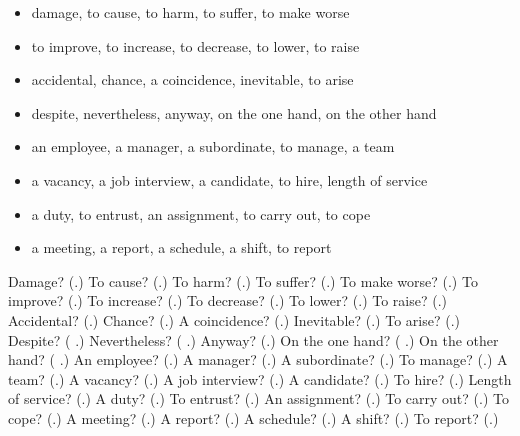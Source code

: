 \begin{itemize}
\raggedright
  \item damage, to cause, to harm, to suffer, to make worse
  \item to improve, to increase, to decrease, to lower, to raise
  \item accidental, chance, a coincidence, inevitable, to arise
  \item despite, nevertheless, anyway, on the one hand, on the other hand
  \item an employee, a manager, a subordinate, to manage, a team
  \item a vacancy, a job interview, a candidate, to hire, length of service
  \item a duty, to entrust, an assignment, to carry out, to cope
  \item a meeting, a report, a schedule, a shift, to report
\end{itemize}

\begin{tcolorbox}[breakable,colback=teal!4,colframe=teal!35!black,title={Before you move on}]
Damage? (\textbf{}.) To cause? (\textbf{}.) To harm? (\textbf{}.) To suffer? (\textbf{}.) To make worse? (\textbf{}.) To improve? (\textbf{}.) To increase? (\textbf{}.) To decrease? (\textbf{}.) To lower? (\textbf{}.) To raise? (\textbf{}.) Accidental? (\textbf{}.) Chance? (\textbf{}.) A coincidence? (\textbf{}.) Inevitable? (\textbf{}.) To arise? (\textbf{}.) Despite? (\textbf{ }.) Nevertheless? (\textbf{  }.) Anyway? (\textbf{}.) On the one hand? (\textbf{  }.) On the other hand? (\textbf{  }.) An employee? (\textbf{}.) A manager? (\textbf{}.) A subordinate? (\textbf{}.) To manage? (\textbf{}.) A team? (\textbf{}.) A vacancy? (\textbf{}.) A job interview? (\textbf{}.) A candidate? (\textbf{}.) To hire? (\textbf{}.) Length of service? (\textbf{}.) A duty? (\textbf{}.) To entrust? (\textbf{}.) An assignment? (\textbf{}.) To carry out? (\textbf{}.) To cope? (\textbf{}.) A meeting? (\textbf{}.) A report? (\textbf{}.) A schedule? (\textbf{}.) A shift? (\textbf{}.) To report? (\textbf{}.)
\end{tcolorbox}
